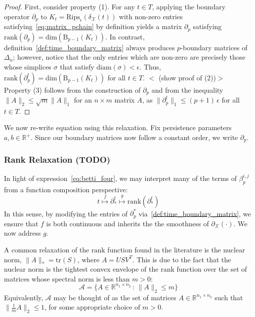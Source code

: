 \documentclass[10pt]{article}
\begin{document}
\begin{proof}
First, consider property (1). For any $t \in T$, applying the boundary operator $\partial_p$ to $K_t = \mathrm{Rips}_\epsilon(\delta_{\mathcal{X}}(t))$ with non-zero entries satisfying~\eqref{eq:matrix_pchain} by definition yields a matrix $\partial_p$ satisfying $\mathrm{rank}(\partial_p) = \mathrm{dim}(\mathrm{B}_{p-1}(K_t))$. In contrast, definition~\eqref{def:time_boundary_matrix} always produces $p$-boundary matrices of $\Delta_n$; however, notice that the only entries which are non-zero are precisely those whose simplices $\sigma$ that satisfy $\mathrm{diam}(\sigma) < \epsilon$. Thus, $\mathrm{rank}(\partial_p^t) = \mathrm{dim}(\mathrm{B}_{p-1}(K_t))$ for all $t \in T$. 
$<$ (show proof of (2))$>$
Property (3) follows from the construction of $\partial_p$ and from the inequality $\lVert A \rVert_2 \leq \sqrt{m} \lVert A \rVert_1$ for an $n \times m$ matrix $A$, as $\lVert \partial_p^t \rVert_1 \leq (p+1) \, \epsilon$ for all $t \in T$.

\end{proof}

We now re-write equation using this relaxation. Fix persistence parameters $a,b \in \mathbb{R}^+$. Since our boundary matrices now follow a constant order, we write $\partial_p^{}$.


\subsubsection*{Rank Relaxation (TODO)}
In light of expression~\eqref{eq:betti_four}, we may interpret many of the terms of $\beta_p^{i,j}$ from a function composition perspective: 
$$ t \stackrel{f}{\mapsto} \partial_\ast^t \stackrel{g}{\mapsto} \mathrm{rank}(\partial_\ast^t ) $$
In this sense, by modifying the entries of $\partial_p^\ast$ via~\ref{def:time_boundary_matrix}, we ensure that $f$ is both continuous and inherits the the smoothness of $\partial_\mathcal{X}(\cdot)$. We now address $g$.

A common relaxation of the $\mathrm{rank}$ function found in the literature is the nuclear norm, $\lVert A \rVert_\ast = \mathrm{tr}(S)$, where $A = U S V^T$. This is due to the fact that the nuclear norm is the tightest convex envelope of the $\mathrm{rank}$ function over the set of matrices whose spectral norm is less than $m > 0$:
$$ \mathcal{A} = \{ A \in \mathbb{R}^{n_1 \times n_2} \,:\, \lVert A \rVert_2 \leq m \}$$
Equivalently, $\mathcal{A}$ may be thought of as the set of matrices $A \in \mathbb{R}^{n_1 \times n_2}$ such that $\lVert \frac{1}{m}A\rVert_2 \leq 1$, for some appropriate choice of $m > 0$. 
 
\end{document}
